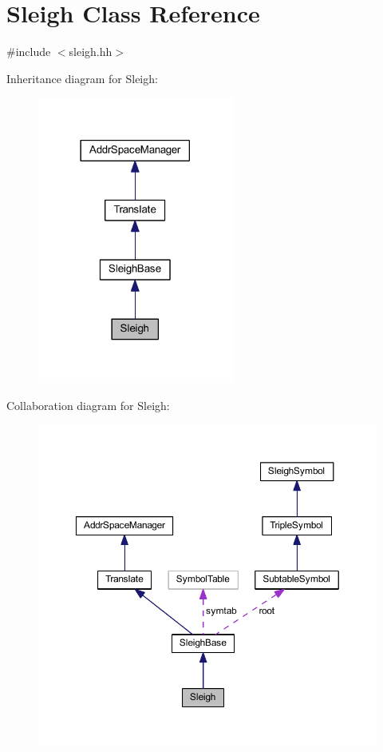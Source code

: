 \hypertarget{class_sleigh}{}\section{Sleigh Class Reference}
\label{class_sleigh}


{\ttfamily \#include $<$sleigh.\+hh$>$}



Inheritance diagram for Sleigh\+:
\nopagebreak
\begin{figure}[H]
\begin{center}
\leavevmode
\includegraphics[width=182pt]{class_sleigh__inherit__graph}
\end{center}
\end{figure}


Collaboration diagram for Sleigh\+:
\nopagebreak
\begin{figure}[H]
\begin{center}
\leavevmode
\includegraphics[width=350pt]{class_sleigh__coll__graph}
\end{center}
\end{figure}
